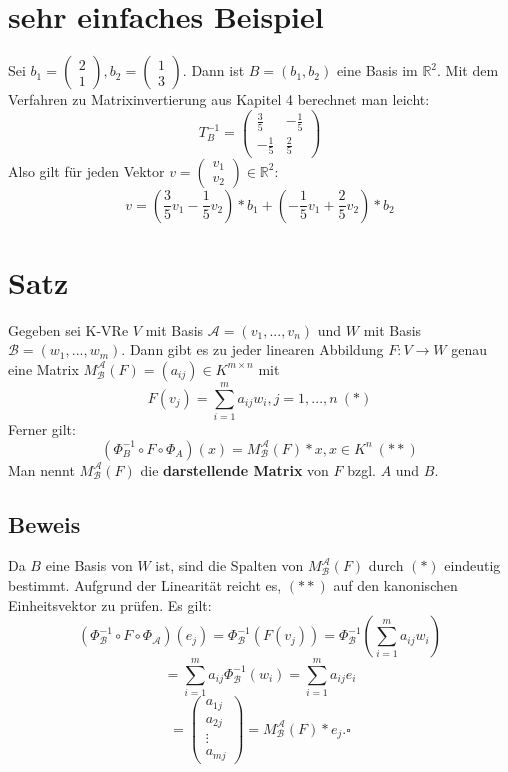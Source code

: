 \documentclass{scrbook}
\begin{document}
\section{sehr einfaches Beispiel}
Sei $b_1=\left(
\begin{array}{c}
2\\1
\end{array}
\right), b_2 = \left(
\begin{array}{c}
1\\3
\end{array}
\right)$. Dann ist $B=(b_1,b_2)$ eine Basis im $\mathbb{R}^2$. Mit dem Verfahren zu Matrixinvertierung aus Kapitel 4 berechnet man leicht:\[
T^{-1}_B = \left(
\begin{array}{cc}
\frac{3}{5}&-\frac{1}{5}\\
-\frac{1}{5}&\frac{2}{5}
\end{array}
\right)
\] Also gilt für jeden Vektor $v=\left(
\begin{array}{c}
v_1\\v_2
\end{array}
\right)\in \mathbb{R}^2$:
\[v=\left(\frac{3}{5}v_1 - \frac{1}{5}v_2\right)*b_1+\left(-\frac{1}{5}v_1+\frac{2}{5}v_2\right)*b_2\]
\section{Satz}
Gegeben sei K-VRe $V$ mit Basis $\mathscr{A} = (v_1,...,v_n)$ und $W$ mit Basis $\mathscr{B} = (w_1,...,w_m)$. Dann gibt es zu jeder linearen Abbildung $F:V\rightarrow W$ genau eine Matrix $M_\mathscr{B}^\mathscr{A}(F) = (a_{ij})\in K^{m\times n}$ mit \[F(v_j)= \sum ^m_{i=1} a_{ij}w_i,j=1,...,n \ (*)\]
Ferner gilt:
\[(\Phi_B^{-1} \circ F \circ \Phi_A)(x) = M^\mathscr{A}_\mathscr{B}(F)*x, x\in K^n \ (**)\]
Man nennt $M^\mathscr{A}_\mathscr{B}(F)$ die \textbf{darstellende Matrix} von $F$ bzgl. $A$ und $B$.
\subsection*{Beweis}
Da $B$ eine Basis von $W$ ist, sind die Spalten von $M^\mathscr{A}_\mathscr{B}(F)$ durch $(*)$ eindeutig bestimmt. Aufgrund der Linearität reicht es, $(**)$ auf den kanonischen Einheitsvektor zu prüfen. Es gilt:\[(\Phi^{-1}_\mathscr{B}\circ F\circ \Phi_\mathscr{A})(e_j)=\Phi_\mathscr{B}^{-1}(F(v_j))=\Phi_\mathscr{B}^{-1}(\sum^m_{i=1}a_{ij}w_i)\]\[=\sum^m_{i=1}a_{ij}\Phi_\mathscr{B}^{-1}(w_i) = \sum^m_{i=1}a_{ij}e_i\]
\[= \left(
\begin{array}{c}
a_{1j}\\a_{2j}\\\vdots\\a_{mj}
\end{array}
\right) = M_\mathscr{B}^\mathscr{A}(F)*e_j.\square\]
\end{document}
